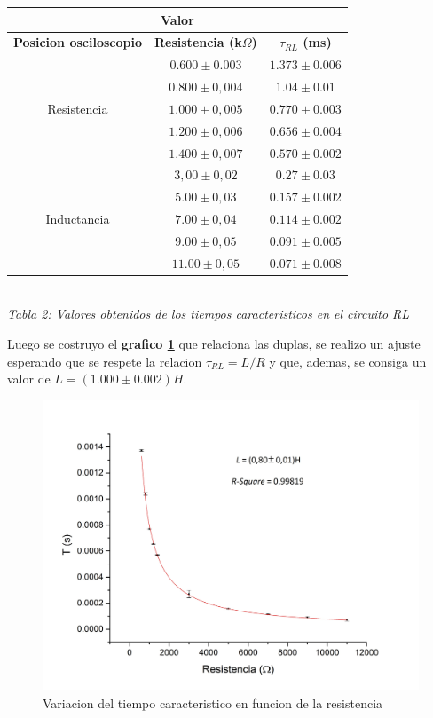 \documentclass[11pt,a4paper]{article}
\begin{document}
\begin{center}
\begin{tabular}{||c|c|c||}
\hline
\multicolumn{3}{||c||}{\textbf{Valor}} \\ \hline
\textbf{Posicion osciloscopio} & \textbf{Resistencia (k$\Omega$)} & \textbf{$\tau_{RL}$ (ms)}\\ \hline 
\multirow {5}{2cm}{Resistencia} & $0.600\pm0.003$ & $1.373 \pm 0.006$ \\ \cline {2-3}
& $0.800\pm0,004$ & $1.04\pm 0.01$ \\ \cline {2-3} 
& $1.000\pm0,005$ & $0.770 \pm 0.003$ \\ \cline {2-3}
& $1.200\pm0,006$ & $0.656 \pm 0.004$ \\ \cline {2-3}
& $1.400\pm0,007$ & $0.570 \pm 0.002$ \\ \hline
\multirow {5}{2cm}{Inductancia} & $3,00\pm0,02$ & $0.27 \pm 0.03$ \\ \cline {2-3}
& $5.00\pm0,03$ & $0.157 \pm 0.002$ \\ \cline {2-3}
& $7.00\pm0,04$ & $0.114 \pm 0.002$ \\ \cline {2-3}
& $9.00\pm0,05$ & $0.091 \pm 0.005$ \\ \cline {2-3} 
& $11.00\pm0,05$ & $0.071 \pm 0.008$ \\ \hline
\end{tabular}\\[0.3cm]

 \textit{Tabla 2: Valores obtenidos de los tiempos caracteristicos en el circuito RL}
\end{center}

Luego se costruyo el \textbf{grafico \ref{fig:T-RL}} que relaciona las duplas, se realizo un ajuste esperando que se respete la relacion $\tau_{RL} = L/R$ y que, ademas, se consiga un valor de $L = (1.000 \pm 0.002) H$.

\begin{figure}[H]
\centering
\includegraphics[scale=0.4]{TauRCvsR_Todo_en_Serie}
  \caption{Variacion del tiempo caracteristico en funcion de la resistencia}
  \label{fig:T-RL}
\end{figure}
\end{document}
